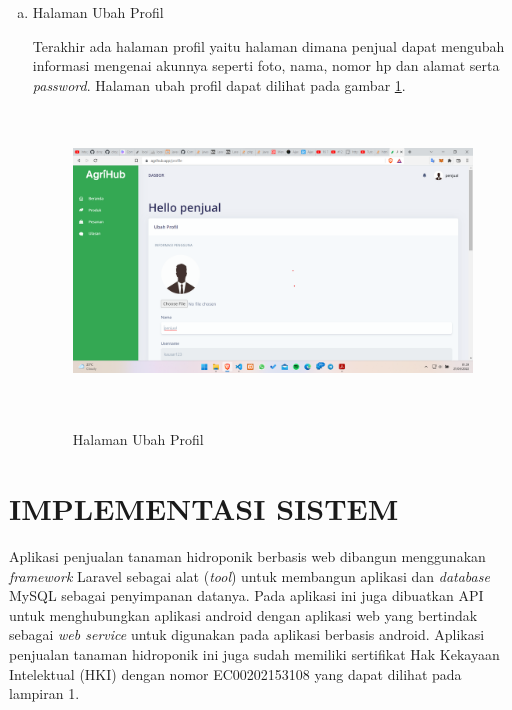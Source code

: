 \begin{enumerate}
\begin{enumerate}[a.]
		\item Halaman Ubah Profil
		\par Terakhir ada halaman profil yaitu halaman dimana penjual dapat mengubah informasi mengenai akunnya seperti foto, nama, nomor hp dan alamat serta \textit{password}. Halaman ubah profil dapat dilihat pada gambar \ref*{profil}.
		\begin{figure}[H]
			\centering
			{\includegraphics [width = 13.3cm, height= 8cm]{gambar/penjual/profil}}
			\caption{Halaman Ubah Profil}
			\label{profil}
		\end{figure}
	\end{enumerate}
\end{enumerate}

\section{\uppercase{Implementasi Sistem}}
Aplikasi penjualan tanaman hidroponik berbasis web dibangun
menggunakan \textit{framework} Laravel sebagai alat (\textit{tool}) untuk membangun aplikasi dan \textit{database} MySQL sebagai penyimpanan datanya. Pada aplikasi ini juga dibuatkan API untuk menghubungkan aplikasi android dengan aplikasi web yang bertindak sebagai \textit{web service} untuk digunakan pada aplikasi berbasis android. Aplikasi penjualan tanaman hidroponik ini juga sudah memiliki sertifikat Hak Kekayaan Intelektual (HKI) dengan nomor EC00202153108 yang dapat dilihat pada lampiran 1.


